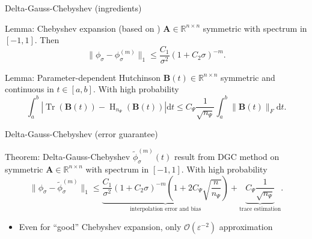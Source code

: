 \documentclass[aspectratio=169, leqno, 12pt]{beamer}
\newcommand{\mtx}[1]{\boldsymbol{#1}}
\DeclareMathOperator{\Tr}{Tr}
\DeclareMathOperator{\Hutch}{H}
\begin{document}
\begin{frame}{Delta-Gauss-Chebyshev (ingredients)}
    \begin{block}{Lemma: Chebyshev expansion (based on \cite{trefethen2008gauss})}
        $\mtx{A} \in \mathbb{R}^{n \times n}$ symmetric with spectrum
        in $[-1, 1]$. Then
        \begin{equation}
            \lVert  \phi_{\sigma} - \phi_{\sigma}^{(m)} \rVert _1 \leq \frac{C_1}{\sigma^2}(1 + C_2 \sigma)^{-m}.
        \end{equation}
    \end{block}
    \begin{block}{Lemma: Parameter-dependent Hutchinson \cite{he2023parameter}}
        $\mtx{B}(t) \in \mathbb{R}^{n \times n}$ symmetric and continuous in
        $t \in [a, b]$. With high probability
        \begin{equation}
            \int_{a}^{b} \left| \Tr(\mtx{B}(t)) - \Hutch_{n_{\Psi}}(\mtx{B}(t)) \right| \mathrm{d}t \leq C_{\Psi} \frac{1}{\sqrt{n_{\Psi}}} \int_{a}^{b} \lVert \mtx{B}(t) \rVert _F \mathrm{d}t.
        \end{equation}
    \end{block}
\end{frame}

\begin{frame}{Delta-Gauss-Chebyshev (error guarantee)}
    \begin{block}{Theorem: Delta-Gauss-Chebyshev}
        $\widetilde{\phi}_{\sigma}^{(m)}(t)$ result from \gls{DGC} method
        on symmetric $\mtx{A} \in \mathbb{R}^{n \times n}$ with spectrum in $[-1, 1]$.
        With high probability
        \begin{equation}
            \lVert \phi_{\sigma} - \widetilde{\phi}_{\sigma}^{(m)}\rVert _1
            \leq \underbrace{\frac{C_1}{\sigma^2} (1 + C_2 \sigma)^{-m} \left( 1 + 2 C_{\Psi} \sqrt{\frac{n}{n_{\Psi}}} \right)}_{\text{interpolation error and bias}} + \underbrace{C_{\Psi} \frac{1}{\sqrt{n_{\Psi}}}}_{\text{trace estimation}}.
        \end{equation}
    \end{block}
    \begin{itemize}
        \item Even for \enquote{good} Chebyshev expansion, only $\mathcal{O}(\varepsilon^{-2})$ approximation
    \end{itemize}
\end{frame}
\end{document}
